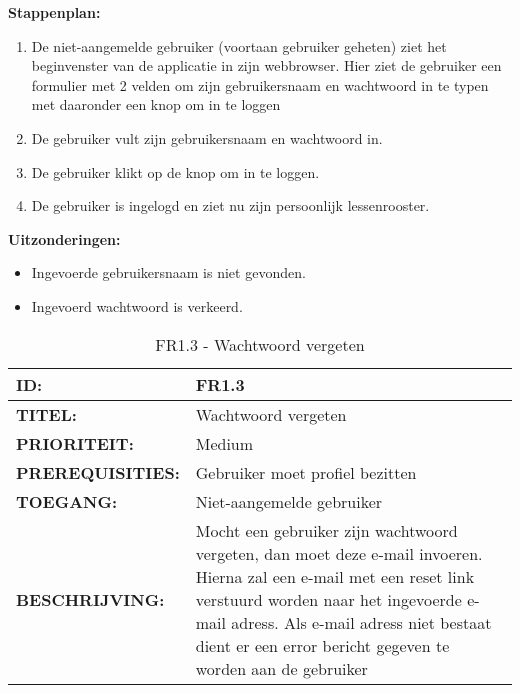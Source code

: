 \textbf{Stappenplan:}
\begin{enumerate}
\item De niet-aangemelde gebruiker (voortaan gebruiker geheten) ziet het beginvenster van de applicatie in zijn webbrowser. Hier ziet de gebruiker een formulier met 2 velden om zijn gebruikersnaam en wachtwoord in te typen met daaronder een knop om in te loggen
\item De gebruiker vult zijn gebruikersnaam en wachtwoord in.
\item De gebruiker klikt op de knop om in te loggen.
\item De gebruiker is ingelogd en ziet nu zijn persoonlijk lessenrooster.
\end{enumerate}

\textbf{Uitzonderingen:}
\begin{itemize}
\item Ingevoerde gebruikersnaam is niet gevonden.
\item Ingevoerd wachtwoord is verkeerd.
\end{itemize}


\noindent\begin{table}[H]
            \begin{tabular}{l | p{10cm}}
                \textbf{ID:} & FR1.3 \\ \hline
                \textbf{TITEL:} & Wachtwoord vergeten \\ \hline
                \textbf{PRIORITEIT:} &  Medium \\ \hline
                \textbf{PREREQUISITIES:} & Gebruiker moet profiel bezitten\\ \hline
                \textbf{TOEGANG:} &  Niet-aangemelde gebruiker \\ \hline
                \textbf{BESCHRIJVING:} & Mocht een gebruiker zijn wachtwoord vergeten, dan moet deze e-mail invoeren. 
                                        Hierna zal een e-mail met een reset link verstuurd worden naar het ingevoerde e-mail adress. 
                                        Als e-mail adress niet bestaat dient er een error bericht gegeven te worden aan de gebruiker\\
            \end{tabular}\\
            \caption{FR1.3 - Wachtwoord vergeten}
            \label{tab:FR1.3 - Wachtwoord vergeten}
        \end{table}

